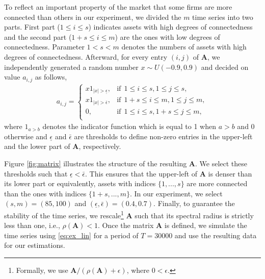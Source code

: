 

To reflect an important property of the market that some firms are more connected than others in our experiment, we divided the $m$ time series into two parts. 
First part ($1\leq i\leq s$) indicates assets with high degrees of connectedness and the second part ($1+s\leq i\leq m$) are the ones with low degrees of connectedness.
Parameter $1<s<m$ denotes the numbers of assets with high degrees of connectedness.
Afterward, for every entry $(i,j)$ of $\textbf{A}$, we independently generated a random number $x\sim U(-0.9, 0.9)$ and decided on value $a_{i,j}$ as follows,
\begin{align}\label{eq:rules}
    a_{i,j}=\left\{
\begin{array}{ll}
      x 1_{|x| > \underline{\epsilon} },  & \text{if}\ \ 1\leq i\leq s, 1\leq j\leq s, \\
      x 1_{|x| > \overline{\epsilon} },  & \text{if}\ \ 1+s\leq i\leq m, 1\leq j\leq m, \\
      0,  & \text{if}\ \ 1\leq i\leq s, 1+s\leq j\leq m, \\
\end{array} 
\right.
\end{align}
where $1_{a>b}$ denotes the indicator function which is equal to 1 when $a>b$ and $0$ otherwise and $\underline{\epsilon}$ and $\bar{\epsilon}$ are thresholds to define non-zero entries in the upper-left and the lower part of $\textbf{A}$, respectively.

Figure \ref{fig:matrix} illustrates the structure of the resulting $\textbf{A}$.
We select these thresholds such that $\underline{\epsilon}<\bar{\epsilon}$. 
This ensures that the upper-left of $\textbf{A}$ is denser than its lower part or equivalently, assets with indices $\{1,...,s\}$ are more connected than the ones with indices $\{1+s,...,m\}$.
In our experiment, we select $(s,m)=(85,100)$ and $(\underline{\epsilon},\bar{\epsilon})=(0.4,0.7)$. 
Finally, to guarantee the stability of the time series, we rescale\footnote{Formally, we use $\textbf{A}/(\rho(\textbf{A}) + \epsilon)$, where $0<\epsilon$.} $\textbf{A}$ such that its spectral radius is strictly less than one, i.e.,  $\rho(\textbf{A})< 1$. 
Once the matrix $\textbf{A}$ is defined, we simulate the time series using \eqref{eq:ex_lin} for a period of $T = 30000$ and use the resulting data for our estimations.

